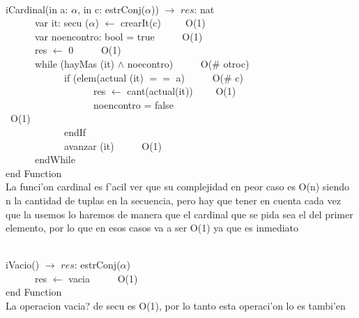 \documentclass[a4paper,10pt]{article}
\begin{document}
\begin{algoritmo}
\caption{}\\
  iCardinal(in a: $\alpha$, in c: estrConj($\alpha$)) $\rightarrow$ $res$: nat \\
	\indent \ \ \ \ \ \ var it: secu ($\alpha$) $\gets$ crearIt(c)\ \ \ \ \ O(1)\\
	\indent \ \ \ \ \ \ var noencontro: bool = true \ \ \ \ \ O(1)\\
	\indent \ \ \ \ \ \ res $\gets$ 0 \ \ \ \ \ O(1)\\
	\indent \ \ \ \ \ \ while (hayMas (it) $\wedge$ noecontro) \ \ \ \ \ O(\# otroc)\\
	\indent \ \ \ \ \ \ \ \ \ \ \ \  if (elem(actual (it) $==$ a)  \ \ \ \ \ O(\# c)\\
	\indent \ \ \ \ \ \ \ \ \ \ \ \ \ \ \ \ \ \ res $\gets$ cant(actual(it))  \ \ \ \ O(1)\\
	\indent \ \ \ \ \ \ \ \ \ \ \ \ \ \ \ \ \ \ noencontro = false  \ \ \\ \ O(1)\\
	\indent \ \ \ \ \ \ \ \ \ \ \ \  endIf \ \ \ \ \ \\
	\indent \ \ \ \ \ \ \ \ \ \ \ \  avanzar (it) \ \ \ \ \ O(1)\\
	\indent \ \ \ \ \ \ endWhile \ \ \ \ \ \\
   end Function \\
   
   La funci'on cardinal es f'acil ver que su complejidad en peor caso es O(n) siendo n la cantidad de tuplas en la secuencia, pero hay que tener en cuenta cada vez que la usemos lo haremos de manera que el cardinal que se pida sea el del primer elemento, por lo que en esos casos va a ser O(1) ya que es inmediato
\end{algoritmo}

\begin{algoritmo}
\caption{}\\
  iVacio() $\rightarrow$ $res$: estrConj($\alpha$) \\
	\indent \ \ \ \ \ \  res $\gets$ vacia  \ \ \ \ \ O(1)\\
  end Function \\
   
   La operacion vacia? de secu es O(1), por lo tanto esta operaci'on lo es tambi'en
  
\end{algoritmo}
\end{document}
